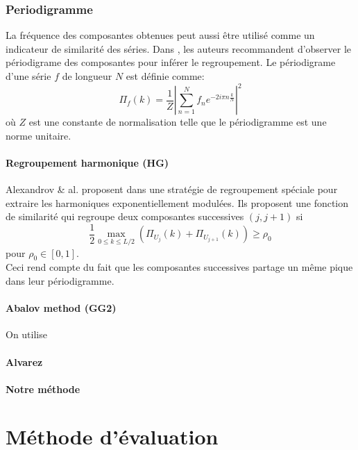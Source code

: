 \documentclass{gretsi}
\begin{document}
\subsubsection{Periodigramme}

La fréquence des composantes obtenues peut aussi être utilisé comme un indicateur de similarité des séries. Dans \cite{GNZ_10_SSA}, les auteurs recommandent d'observer le périodigrame des composantes pour inférer le regroupement. Le périodigrame d'une série $f$ de longueur $N$ est définie comme:$$
\Pi_f(k) = \frac{1}{Z}\left|\sum_{n=1}^N f_n e^{-2i\pi n \frac{k}{N}}\right|^2
$$ où $Z$ est une constante de normalisation telle que le périodigramme est une norme unitaire.\\

\paragraph{Regroupement harmonique (HG)}\label{par:alex} Alexandrov \& al. proposent dans \cite{alexandrov_05_auto} une stratégie de regroupement spéciale pour extraire les harmoniques exponentiellement modulées. Ils proposent une fonction de similarité qui regroupe deux composantes successives $(j, j+1)$ si$$
\frac{1}{2}\max_{0\le k \le L/2}\left(\Pi_{U_j}(k) + \Pi_{U_{j+1}}(k)\right) \ge \rho_0
$$ pour $\rho_0\in \left[0, 1\right]$.\\

Ceci rend compte du fait que les composantes successives partage un même pique dans leur périodigramme.


\paragraph{Abalov method (GG2)}
\label{par:abalov}
\cite{abalov_14_auto}
On utilise
\paragraph{Alvarez}
\label{par:alva}
\cite{alvarez_2013_auto}
\paragraph{Notre méthode}
\label{par:tomtom}


        

\section{Méthode d'évaluation}
\label{sec:eval}
\end{document}
